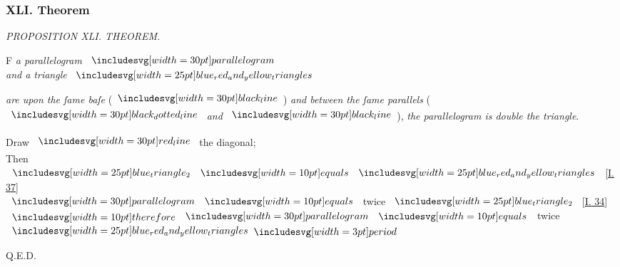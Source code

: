 \documentclass[11pt,preview]{standalone}
\begin{document}
\subsubsection{XLI. Theorem}

\hfill

\begin{minipage}[t]{0.43\textwidth}
    \vspace{20pt}
    
\end{minipage}%
\hfill
\begin{minipage}[t]{0.54\textwidth}
    \begin{center}
        \textit{PROPOSITION XLI. THEOREM.}\label{book1pr41} \\
    \end{center}

    \hfill

    \begin{center}
        \raggedright \lettrine[lines=3, loversize=1, nindent=0pt]{}{}F \textit{a parallelogram} $\img[0][0][30]{parallelogram}$\\ \textit{and a triangle} $\img{blue_red_and_yellow_triangles}$
    \end{center}
    \raggedright \textit{are upon the ſame baſe} (\hspace{-1ex}$\blackline$\hspace{-1ex}) \textit{and between the ſame parallels} (\hspace{-1ex}$\dottedblackline$ \textit{and} $\blackline$\hspace{-1ex}), \textit{the parallelogram is double the triangle}.
\end{minipage}

\hfill

\hfill

\begin{center}
    Draw $\redline$ the diagonal;\\
    Then $\img{blue_triangle_2} \bequals \img{blue_red_and_yellow_triangles}$ [\hyperref[book1pr37]{\textsc{I.} 37}]\\
    $\img[0][0][30]{parallelogram} \bequals$ twice $\img{blue_triangle_2}$ [\hyperref[book1pr34]{\textsc{I.} 34}]\\
    $\btherefore \img[0][0][30]{parallelogram} \bequals$ twice $\img{blue_red_and_yellow_triangles} \bperiod$
\end{center}

\hfill

\hfill Q.E.D.
\end{document}
